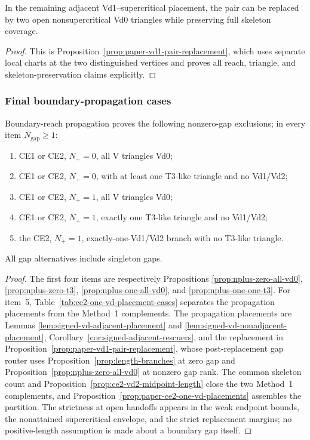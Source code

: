 \begin{lemma}
\label{lem:vd1-pair-replacement}
In the remaining adjacent Vd1--supercritical placement, the pair can be
replaced by two open nonsupercritical Vd0 triangles while preserving full skeleton
coverage.
\end{lemma}

\begin{proof}
This is Proposition~\ref{prop:paper-vd1-pair-replacement}, which uses separate
local charts at the two distinguished vertices and proves all reach, triangle, and
skeleton-preservation claims explicitly.
\end{proof}

\subsubsection{Final boundary-propagation cases}

\begin{proposition}
\label{prop:demand-branches}
Boundary-reach propagation proves the following nonzero-gap exclusions; in
every item $N_{\mathrm{gap}}\ge1$:
\begin{enumerate}
\item CE1 or CE2, $N_+=0$, all V triangles Vd0;
\item CE1 or CE2, $N_+=0$, with at least one T3-like triangle and no Vd1/Vd2;
\item CE1 or CE2, $N_+=1$, all V triangles Vd0;
\item CE1 or CE2, $N_+=1$, exactly one T3-like triangle and no Vd1/Vd2;
\item the CE2, $N_+=1$, exactly-one-Vd1/Vd2 branch with no T3-like
triangle.
\end{enumerate}
All gap alternatives include singleton gaps.
\end{proposition}

\begin{proof}
The first four items are respectively Propositions
\ref{prop:nplus-zero-all-vd0}, \ref{prop:nplus-zero-t3},
\ref{prop:nplus-one-all-vd0}, and \ref{prop:nplus-one-one-t3}.
For item~5, Table~\ref{tab:ce2-one-vd-placement-cases} separates the
propagation placements from the Method~1 complements.  The propagation
placements are Lemmas \ref{lem:signed-vd-adjacent-placement} and
\ref{lem:signed-vd-nonadjacent-placement},
Corollary~\ref{cor:signed-adjacent-rescuers}, and the replacement in
Proposition~\ref{prop:paper-vd1-pair-replacement}, whose post-replacement gap
router uses Proposition~\ref{prop:length-branches} at zero gap and
Proposition~\ref{prop:nplus-zero-all-vd0} at nonzero gap rank.  The common skeleton count and
Proposition~\ref{prop:ce2-vd2-midpoint-length} close the two Method~1
complements, and Proposition~\ref{prop:paper-ce2-one-vd-placements} assembles
the partition.  The strictness at open handoffs appears in
the weak endpoint bounds, the nonattained supercritical envelope, and the
strict replacement margins; no positive-length assumption is made about a
boundary gap itself.
\end{proof}

